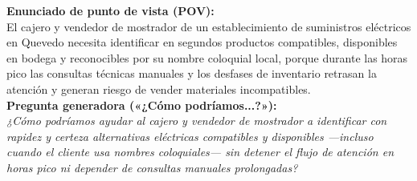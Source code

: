 \begin{tcolorbox}[colback=white,colframe=uteqgreen,boxrule=0.8pt,arc=1.5mm]
\textbf{Enunciado de punto de vista (POV):}\\
El cajero y vendedor de mostrador de un establecimiento de suministros el\'ectricos en Quevedo necesita identificar en segundos productos compatibles, disponibles en bodega y reconocibles por su nombre coloquial local, porque durante las horas pico las consultas t\'ecnicas manuales y los desfases de inventario retrasan la atenci\'on y generan riesgo de vender materiales incompatibles.\\[8pt]
\textbf{Pregunta generadora («¿C\'omo podr\'iamos...?»):}\\
\emph{¿C\'omo podr\'iamos ayudar al cajero y vendedor de mostrador a identificar con rapidez y certeza alternativas el\'ectricas compatibles y disponibles —incluso cuando el cliente usa nombres coloquiales— sin detener el flujo de atenci\'on en horas pico ni depender de consultas manuales prolongadas?}
\end{tcolorbox}
